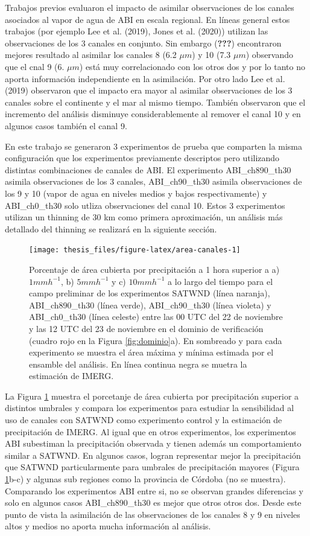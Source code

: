 \documentclass[12pt,oneside]{reedthesis}
\begin{document}
Trabajos previos evaluaron el impacto de asimilar observaciones de los canales asociados al vapor de agua de ABI en escala regional. En líneas general estos trabajos (por ejemplo Lee et al. (2019), Jones et al. (2020)) utilizan las observaciones de los 3 canales en conjunto. Sin embargo ({\textbf{???}}) encontraron mejores resultado al asimilar los canales 8 (6.2 \(\mu m\)) y 10 (7.3 \(\mu m\)) observando que el cnal 9 (6. \(\mu m\)) está muy correlacionado con los otros dos y por lo tanto no aporta información independiente en la asimilación. Por otro lado Lee et al. (2019) observaron que el impacto era mayor al asimilar observaciones de los 3 canales sobre el continente y el mar al mismo tiempo. También observaron que el incremento del análisis disminuye considerablemente al remover el canal 10 y en algunos casos también el canal 9.

En este trabajo se generaron 3 experimentos de prueba que comparten la misma configuración que los experimentos previamente descriptos pero utilizando distintas combinaciones de canales de ABI. El experimento ABI\_ch890\_th30 asimila observaciones de los 3 canales, ABI\_ch90\_th30 asimila observaciones de los 9 y 10 (vapor de agua en niveles medios y bajos respectivamente) y ABI\_ch0\_th30 solo utliza observaciones del canal 10. Estos 3 experimentos utilizan un thinning de 30 km como primera aproximación, un análisis más detallado del thinning se realizará en la siguiente sección.


\begin{figure}
\texttt{[image: thesis\_files/figure-latex/area-canales-1]} \caption{Porcentaje de área cubierta por precipitación a 1 hora superior a a) \(1 mmh^{-1}\), b) \(5 mmh^{-1}\) y c) \(10 mmh^{-1}\) a lo largo del tiempo para el campo preliminar de los experimentos SATWND (línea naranja), ABI\_ch890\_th30 (línea verde), ABI\_ch90\_th30 (línea violeta) y ABI\_ch0\_th30 (línea celeste) entre las 00 UTC del 22 de noviembre y las 12 UTC del 23 de noviembre en el dominio de verificación (cuadro rojo en la Figura \ref{fig:dominio}a). En sombreado y para cada experimento se muestra el área máxima y mínima estimada por el ensamble del análisis. En línea continua negra se muetra la estimación de IMERG.}\label{fig:area-canales}
\end{figure}
La Figura \ref{fig:area-canales} muestra el porcetanje de área cubierta por precipitación superior a distintos umbrales y compara los experimentos para estudiar la sensibilidad al uso de canales con SATWND como experimento control y la estimación de precipitación de IMERG. Al igual que en otros experimentos, los experimentos ABI subestiman la precipitación observada y tienen además un comportamiento similar a SATWND. En algunos casos, logran representar mejor la precipitación que SATWND particularmente para umbrales de precipitación mayores (Figura \ref{fig:area-canales}b-c) y algunas sub regiones como la provincia de Córdoba (no se muestra). Comparando los experimentos ABI entre si, no se observan grandes diferencias y solo en algunos casos ABI\_ch890\_th30 es mejor que otros otros dos. Desde este punto de vista la asimilación de las observaciones de los canales 8 y 9 en niveles altos y medios no aporta mucha información al análisis.
\end{document}

